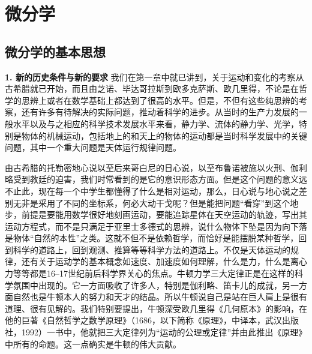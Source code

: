 \chapter{微分学}
\section{微分学的基本思想}

\noindent\textbf{1. 新的历史条件与新的要求}\quad
我们在第一章中就已讲到，关于运动和变化的考察从古希腊就已开始，而且由芝诺、毕达哥拉斯到欧多克萨斯、欧几里得，不论是在哲学的思辨上或者在数学基础上都达到了很高的水平。但是，不但有这些纯思辨的考察，还有许多有待解决的实际问题，推动着科学的进步。从当时的生产力发展的一般水平以及与之相应的科学技术发展水平来看，静力学、流体的静力学、光学，特别是物体的机械运动，包括地上的和天上的物体的运动都是当时科学发展中的关键问题，其中一个重大问题是天体运行规律问题。

由古希腊的托勒密地心说以至后来哥白尼的日心说，以至布鲁诺被施以火刑、伽利略受到教廷的迫害，我们时常看到的是它的意识形态方面。但是这个问题的意义远不止此，现在每一个中学生都懂得了什么是相对运动，那么，日心说与地心说之差别无非是采用了不同的坐标系，何必大动干戈呢？但是能把问题“看穿”到这个地步，前提是要能用数学很好地刻画运动，要能追踪星体在天空运动的轨迹，写出其运动方程式，而不是只满足于亚里士多德式的思辨，说什么物体下坠是因为向下落是物体“自然的本性”之类。这就不但不是依赖哲学，而恰好是能摆脱某种哲学，回到科学的道路上，回到观测、推算等等科学方法的道路上。不仅是天体运动的规律，还有关于运动学的基本概念如速度、加速度如何理解，什么是力，什么是离心力等等都是16--17世纪前后科学界关心的焦点。牛顿力学三大定律正是在这样的科学氛围中出现的。它一方面吸收了许多人，特别是伽利略、笛卡儿的成就，另一方面自然也是牛顿本人的努力和天才的结晶。所以牛顿说自己是站在巨人肩上是很有道理、很有见解的。我们特别要提出，牛顿深受欧几里得《几何原本》的影响，在他的巨著《自然哲学之数学原理》（1686，以下简称《原理》，中译本，武汉出版社，1992）一书中，他就把三大定律列为“运动的公理或定律”并由此推出《原理》中所有的命题。这一点确实是牛顿的伟大贡献。

